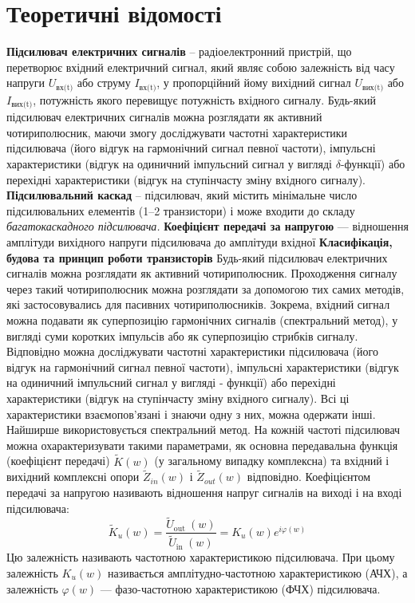 \documentclass[
  ukrainian,
  14pt
]{extreport}
\begin{document}
\section{Теоретичні відомості}
\textbf{Підсилювач електричних сигналів} – радіоелектронний пристрій, що
перетворює вхідний електричний сигнал, який являє собою залежність від часу
напруги $U_{\text{вх(t)}}$ або струму $I_{\text{вх(t)}}$, у пропорційний йому вихідний сигнал $U_{\text{вих(t)}}$ або
$I_{\text{вих(t)}}$, потужність якого перевищує потужність вхідного сигналу. Будь-який
підсилювач електричних сигналів можна розглядати як активний чотириполюсник,
маючи змогу досліджувати частотні характеристики підсилювача (його відгук на
гармонічний сигнал певної частоти), імпульсні характеристики (відгук на
одиничний імпульсний сигнал у вигляді $\delta$-функції) або перехідні характеристики
(відгук на ступінчасту зміну вхідного сигналу).
\textbf{Підсилювальний каскад} – підсилювач, який містить мінімальне число
підсилювальних елементів (1–2 транзистори) і може входити до складу
\textit{багатокаскадного підсилювача.}
\textbf{Коефіцієнт передачі за напругою} — відношення амплітуди вихідного
напруги підсилювача до амплітуди вхідної
\textbf{Класифікація, будова та принцип роботи транзисторів}
Будь-який підсилювач електричних сигналів можна розглядати як
активний чотириполюсник. Проходження сигналу через такий
чотириполюсник можна розглядати за допомогою тих самих методів, які
застосовувались для пасивних чотириполюсників. Зокрема, вхідний сигнал
можна подавати як суперпозицію гармонічних сигналів (спектральний
метод), у вигляді суми коротких імпульсів або як суперпозицію стрибків
сигналу. Відповідно можна досліджувати частотні характеристики
підсилювача (його відгук на гармонічний сигнал певної частоти), імпульсні
характеристики (відгук на одиничний імпульсний сигнал у вигляді -
функції) або перехідні характеристики (відгук на ступінчасту зміну
вхідного сигналу). Всі ці характеристики взаємопов’язані і знаючи одну з
них, можна одержати інші.
Найширше використовується спектральний метод. На кожній частоті
підсилювач можна охарактеризувати такими параметрами, як основна
передавальна функція (коефіцієнт передачі) $\tilde{K}(w)$ (у загальному випадку
комплексна) та вхідний і вихідний комплексні опори $ \tilde{Z}_{in} (w)$ і $\tilde{Z}_{out} (w)$
відповідно.
Коефіцієнтом передачі за напругою називають відношення напруг сигналів
на виході і на вході підсилювача:
$$
\widetilde{K}_{u}(w)=\frac{\widetilde{U}_{\text {out }}(w)}{\widetilde{U}_{\text {in }}(w)}=K_{u}(w) e^{i \varphi(w)}
$$
Цю залежність називають частотною характеристикою підсилювача. При
цьому залежність $K_u(w)$ називається амплітудно-частотною
характеристикою (АЧХ), а залежність $\varphi(w)$ — фазо-частотною
характеристикою (ФЧХ) підсилювача.
\end{document}
